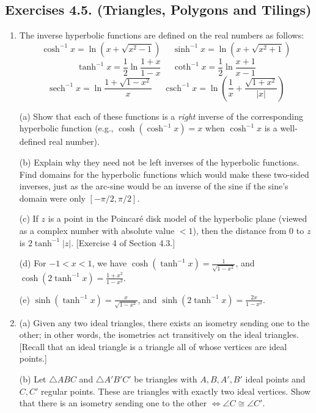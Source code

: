 \documentclass[leqno]{book}
\begin{document}
\subsection*{Exercises 4.5. (Triangles, Polygons and Tilings)} %
\begin{enumerate}
\item The inverse hyperbolic functions are defined on the real numbers as follows:
$$\cosh^{-1}x=\ln(x+\sqrt{x^2-1})~~~~~~\sinh^{-1}x=\ln(x+\sqrt{x^2+1})$$
$$\tanh^{-1}x=\frac 12\ln\frac{1+x}{1-x}~~~~~~\coth^{-1}x=\frac 12\ln\frac{x+1}{x-1}$$
$$\operatorname{sech}^{-1}x=\ln\frac{1+\sqrt{1-x^2}}x~~~~~~\operatorname{csch}^{-1}x=\ln\left(\frac 1x+\frac{\sqrt{1+x^2}}{|x|}\right)$$

(a) Show that each of these functions is a \emph{right} inverse of the corresponding hyperbolic function (e.g., $\cosh(\cosh^{-1}x)=x$ when $\cosh^{-1}x$ is a well-defined real number).

(b) Explain why they need not be left inverses of the hyperbolic functions.  Find domains for the hyperbolic functions which would make these two-sided inverses, just as the arc-sine would be an inverse of the sine if the sine's domain were only $[-\pi/2,\pi/2]$.

(c) If $z$ is a point in the Poincar\'e disk model of the hyperbolic plane (viewed as a complex number with absolute value $<1$), then the distance from $0$ to $z$ is $2\tanh^{-1}|z|$.  [Exercise 4 of Section 4.3.]

(d) For $-1<x<1$, we have $\cosh(\tanh^{-1}x)=\frac 1{\sqrt{1-x^2}}$, and $\cosh(2\tanh^{-1}x)=\frac{1+x^2}{1-x^2}$.

(e) $\sinh(\tanh^{-1}x)=\frac x{\sqrt{1-x^2}}$, and $\sinh(2\tanh^{-1}x)=\frac{2x}{1-x^2}$.

\item (a) Given any two ideal triangles, there exists an isometry sending one to the other; in other words, the isometries act transitively on the ideal triangles.  [Recall that an ideal triangle is a triangle all of whose vertices are ideal points.]

(b) Let $\triangle ABC$ and $\triangle A'B'C'$ be triangles with $A,B,A',B'$ ideal points and $C,C'$ regular points.  These are triangles with exactly two ideal vertices.  Show that there is an isometry sending one to the other $\iff\angle C\cong\angle C'$.


\end{enumerate}
\end{document}
